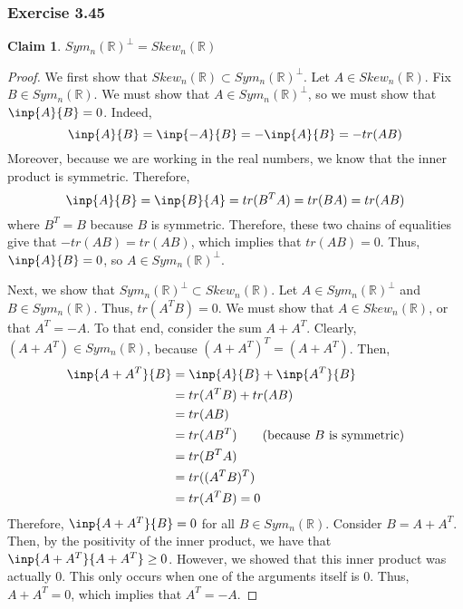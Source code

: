 \documentclass[letterpaper,12pt]{article}
\theoremstyle{definition}
\newtheorem{claim}[theorem]{Claim}
\begin{document}
\subsubsection*{Exercise 3.45}
\begin{claim}
	$Sym_n (\mathbb{R})^{\perp} = Skew_n(\mathbb{R})$
\end{claim}
\begin{proof}
	We first show that $Skew_n(\mathbb{R}) \subset Sym_n (\mathbb{R})^{\perp}$. Let $A \in Skew_n(\mathbb{R})$. Fix $B \in Sym_n (\mathbb{R})$. We must show that $A \in Sym_n (\mathbb{R})^{\perp}$, so we must show that $\inp{A}{B} = 0$. Indeed,
	\begin{equation}
	\inp{A}{B} = \inp{-A}{B} = -\inp{A}{B} = - tr(AB)
	\end{equation}
	Moreover, because we are working in the real numbers, we know that the inner product is symmetric. Therefore,
	\begin{equation}
	\inp{A}{B} = \inp{B}{A} = tr(B^TA) = tr(BA) = tr(AB)
	\end{equation}
	where $B^T = B$ because $B$ is symmetric. Therefore, these two chains of equalities give that $- tr(AB) =  tr(AB)$, which implies that $ tr(AB) = 0$. Thus, $\inp{A}{B} = 0$, so $A \in Sym_n (\mathbb{R})^{\perp}$.
	
	Next, we show that $Sym_n (\mathbb{R})^{\perp} \subset Skew_n(\mathbb{R})$. Let $A \in Sym_n (\mathbb{R})^{\perp}$ and $B \in Sym_n (\mathbb{R})$. Thus, $tr(A^TB) = 0$. We must show that $A \in Skew_n(\mathbb{R})$, or that $A^T = -A$. To that end, consider the sum $A + A^T$. Clearly, $(A + A^T) \in Sym_n (\mathbb{R})$, because $(A + A^T)^T = (A + A^T)$.  Then,
	\begin{align*}
	\inp{A + A^T}{B} &= \inp{A}{B} + \inp{A^T}{B} \\
	&= tr(A^TB) + tr(AB) \\
	&=  tr(AB) \\
	&=  tr(AB^T) \tag{because $B$ is symmetric} \\
	&= tr(B^TA) \\
	&= tr((A^TB)^T) \\
	&= tr(A^TB) = 0
	\end{align*}
	Therefore, $\inp{A + A^T}{B} = 0$ for all $B \in Sym_n (\mathbb{R})$. Consider $B = A + A^T$. Then, by the positivity of the inner product, we have that $\inp{A + A^T}{A + A^T} \geq 0$. However, we showed that this inner product was actually 0. This only occurs when one of the arguments itself is 0. Thus, $A + A^T = 0$, which implies that $A^T = -A$.
\end{proof}
\end{document}
